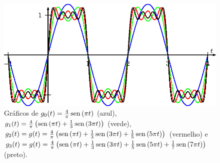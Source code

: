 \begin{ex}
\begin{figure}[!ht]
\begin{center}
\includegraphics{cap_series/pics/figura_4}\end{center}
\caption{\label{fig_conv_quadrangular}Gráficos de $g_0(t)=\frac{4}{\pi}\operatorname{sen}\,(\pi t)$ (azul), $g_1(t)=\frac{4}{\pi}\left(\operatorname{sen}\,(\pi t)+\frac{1}{3}\operatorname{sen}\,(3\pi t)\right)$ (verde), $g_2(t)=g(t)=\frac{4}{\pi}\left(\operatorname{sen}\,(\pi t)+\frac{1}{3}\operatorname{sen}\,(3\pi t)+\frac{1}{5}\operatorname{sen}\,(5\pi t)\right)$ (vermelho) e $g_3(t)=g(t)=\frac{4}{\pi}\left(\operatorname{sen}\,(\pi t)+\frac{1}{3}\operatorname{sen}\,(3\pi t)+\frac{1}{5}\operatorname{sen}\,(5\pi t)+\frac{1}{7}\operatorname{sen}\,(7\pi t)\right)$ (preto).}
\end{figure}
\end{ex}
